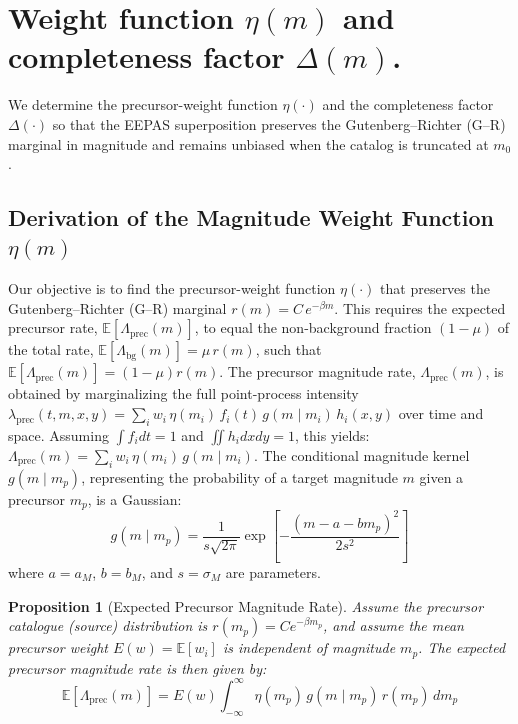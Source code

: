 \documentclass[extra,mreferee]{gji}
\theoremstyle{lemma}
\newcommand{\E}{\mathbb{E}}
\newtheorem{proposition}{Proposition}
\begin{document}
\section{Weight function \texorpdfstring{$\eta(m)$}{eta(m)} and completeness factor \texorpdfstring{$\Delta(m)$}{Delta(m)}.} \label{sec:compensation}


We determine the precursor-weight function $\eta(\cdot)$ and the completeness factor $\Delta(\cdot)$ so that the EEPAS superposition preserves the Gutenberg--Richter (G--R) marginal in magnitude and remains unbiased when the catalog is truncated at $m_0$.



\subsection[Derivation of the Magnitude Weight Function eta(m)]{Derivation of the Magnitude Weight Function \(\eta(m)\)}
Our objective is to find the precursor-weight function $\eta(\cdot)$ that preserves the Gutenberg--Richter (G--R) marginal $r(m)=C\,e^{-\beta m}$. This requires the expected precursor rate, $\E[\Lambda_{\mathrm{prec}}(m)]$, to equal the non-background fraction $(1-\mu)$ of the total rate, $\E[\Lambda_{\mathrm{bg}}(m)] = \mu \, r(m)$, such that $\E[\Lambda_{\mathrm{prec}}(m)] = (1-\mu)r(m)$.
The precursor magnitude rate, $\Lambda_{\mathrm{prec}}(m)$, is obtained by marginalizing the full point-process intensity $\lambda_{\mathrm{prec}}(t,m,x,y) = \sum_i w_i \, \eta(m_i) \, f_i(t) \, g(m \mid m_i) \, h_i(x,y)$ over time and space. Assuming $\int f_i dt = 1$ and $\iint h_i dx dy = 1$, this yields: $\Lambda_{\mathrm{prec}}(m) = \sum_i w_i \, \eta(m_i) \, g(m \mid m_i)$. The conditional magnitude kernel $g(m \mid m_p)$, representing the probability of a target magnitude $m$ given a precursor $m_p$, is a Gaussian:
\begin{equation}\label{eq:g-kernel}
g(m \mid m_p) = \frac{1}{s\sqrt{2\pi}} \exp\!\left[-\frac{(m-a-b m_p)^2}{2s^2}\right]
\end{equation}
where $a=a_M$, $b=b_M$, and $s=\sigma_M$ are parameters.

\begin{proposition}[Expected Precursor Magnitude Rate]
Assume the precursor catalogue (source) distribution is \(r(m_p) = C e^{-\beta m_p}\), and assume the mean precursor weight \(E(w) = \E[w_i]\) is independent of magnitude \(m_p\). The expected precursor magnitude rate is then given by:
\[
\E[\Lambda_{\mathrm{prec}}(m)] = E(w) \int_{-\infty}^{\infty} \eta(m_p) \, g(m \mid m_p) \, r(m_p) \, dm_p
\]
\end{proposition}
\end{document}

